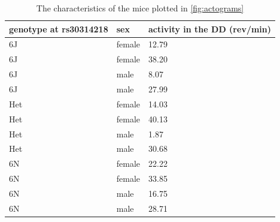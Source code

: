         \begin{table}[h]
            \centering
            \caption{The characteristics of the mice plotted in \autoref{fig:actograms}}
            \begin{tabular}{p{2.5cm}lp{3cm}}
                \hline
                genotype at \newline rs30314218 & sex & activity in the DD (rev/min)\\
                \hline
                6J & female & 12.79 \\ 
                6J & female & 38.20 \\ 
                6J & male & 8.07 \\ 
                6J & male & 27.99 \\ 
                Het & female & 14.03 \\ 
                Het & female & 40.13 \\ 
                Het & male & 1.87 \\ 
                Het & male & 30.68 \\ 
                6N & female & 22.22 \\ 
                6N & female & 33.85 \\ 
                6N & male & 16.75 \\ 
                6N & male & 28.71 \\ 
            \hline
        \end{tabular}
        \label{tab:acto_mice}
    \end{table}

    \FloatBarrier
    \clearpage

